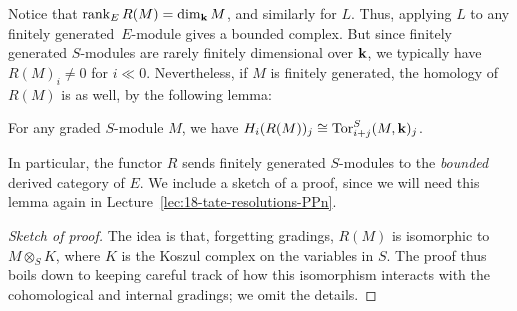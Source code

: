 \documentclass{amsart}
\begin{document}


Notice that $\operatorname{rank}_E R(M) = \dim_{\mathbf{k}} M$, and similarly for $L$. Thus, applying $L$ to any finitely generated~$E$-module gives a bounded complex. But since finitely generated $S$-modules are rarely finitely dimensional over $\mathbf{k}$, we typically have $R(M)_i \ne 0$ for $i \ll 0$. Nevertheless, if $M$ is finitely generated, the homology of $R(M)$ is as well, by the following lemma: 

\begin{lemma}
\label{lem:tor}
For any graded $S$-module $M$, we have $H_i(R(M))_j \cong \operatorname{Tor}^S_{i+j}(M, \mathbf{k})_j$.
\end{lemma}

In particular, the functor $R$ sends finitely generated $S$-modules to the \emph{bounded} derived category of $E$. We include a sketch of a proof, since we will need this lemma again in Lecture~\ref{lec:18-tate-resolutions-PPn}.


\begin{proof}[Sketch of proof]
The idea is that, forgetting gradings, $R(M)$ is isomorphic to $M \otimes_S K$, where $K$ is the Koszul complex on the variables in $S$. The proof thus boils down to keeping careful track of how this isomorphism interacts with the cohomological and internal gradings; we omit the details. 
\end{proof}
\end{document}
